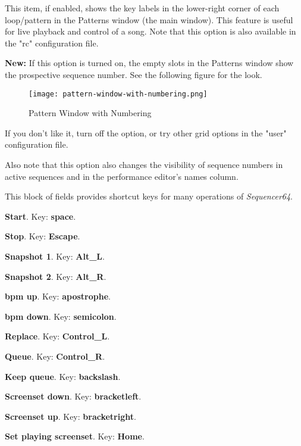    \setcounter{ItemCounter}{0}      %

   This item, if enabled, shows the key labels in the lower-right corner of
   each loop/pattern in the Patterns window (the main window).  This feature is
   useful for live playback and control of a song.
   Note that this option is also available in the "rc" configuration file.

   \textbf{New:}
   If this option is turned on, the
   empty slots in the Patterns window show the prospective sequence number.
   See the following figure for the look.

\begin{figure}[H]
   \centering 
   \texttt{[image: pattern-window-with-numbering.png]}
   \caption{Pattern Window with Numbering}
   \label{fig:seq64_build_with_numbering}
\end{figure}

   If you don't like it, turn off the option, or try other grid options
   in the "user" configuration file.

   Also note that this option also changes the visibility of sequence numbers
   in active sequences and in the performance editor's names column.

   This block of fields provides shortcut keys for many operations of
   \textsl{Sequencer64}.

   \begin{enumber}
      \item \textbf{Start}.
         Key:  \textbf{space}.
      \item \textbf{Stop}.
         Key:  \textbf{Escape}.
      \item \textbf{Snapshot 1}.
         Key:  \textbf{Alt\_L}.
      \item \textbf{Snapshot 2}.
         Key:  \textbf{Alt\_R}.
      \item \textbf{bpm up}.
         Key:  \textbf{apostrophe}.
      \item \textbf{bpm down}.
         Key:  \textbf{semicolon}.
      \item \textbf{Replace}.
         Key:  \textbf{Control\_L}.
      \item \textbf{Queue}.
         Key:  \textbf{Control\_R}.
      \item \textbf{Keep queue}.
         Key:  \textbf{backslash}.
      \item \textbf{Screenset down}.
         Key: \index{keys![} \textbf{bracketleft}.
      \item \textbf{Screenset up}.
         Key: \index{keys!]} \textbf{bracketright}.
      \item \textbf{Set playing screenset}.
         Key:  \textbf{Home}.
   \end{enumber}

